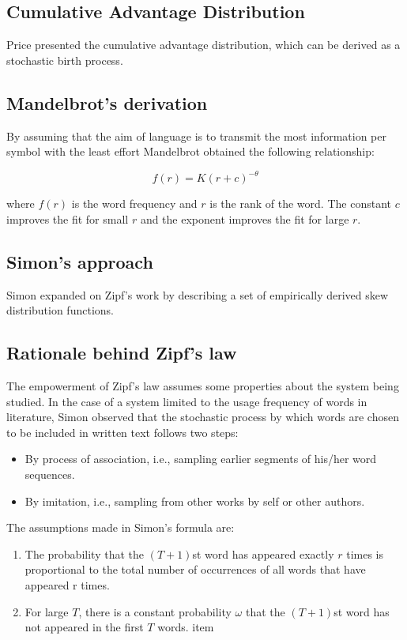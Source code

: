 \documentclass{article} \usepackage{hyperref} \usepackage{graphicx}
\begin{document}
\subsection{Cumulative Advantage Distribution}

Price presented the cumulative advantage distribution, which can be derived
as a stochastic birth process.

\subsection{Mandelbrot's derivation}

By assuming that the aim of language is to transmit the most information per
symbol with the least effort Mandelbrot obtained the following relationship:

\begin{equation}
  \label{simple_equation} f(r) = K(r+c)^{-\theta}
\end{equation}

where $f(r)$ is the word frequency and $r$ is the rank of the word. The
constant $c$ improves the fit for small $r$ and the exponent improves the
fit for large $r$.

\subsection{Simon's approach}

Simon expanded on Zipf's work by describing a set of empirically derived
skew distribution functions.

\subsection{Rationale behind Zipf's law}

The empowerment of Zipf's law assumes some properties about the system being
studied. In the case of a system limited to the usage frequency of words in
literature, Simon observed that the stochastic process by which words are
chosen to be included in written text follows two steps:

\begin{itemize}
  \item By process of association, i.e., sampling earlier segments of
    his/her word sequences.
  \item By imitation, i.e., sampling from other works by self or other
    authors.
\end{itemize}

The assumptions made in Simon's formula are:
\begin{enumerate}
   \item The probability that the $(T + 1)$st word has appeared exactly $r$
     times is proportional to the total number of occurrences of all words
     that have appeared r times.
   \item For large $T$, there is a constant probability $ω$ that the $(T +
     1)$st word has not appeared in the first $T$ words. item
\end{enumerate}
\end{document}
